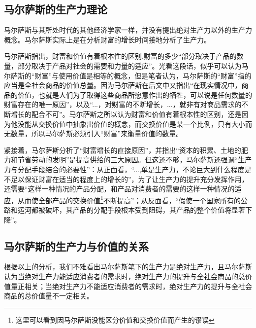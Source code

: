 \subsection{马尔萨斯的生产力理论}

马尔萨斯与其所处时代的其他经济学家一样，并没有提出绝对生产力以外的生产力概念。马尔萨斯实际上是在分析财富的增长时间接地分析了生产力。

马尔萨斯指出，财富和价值有着根本性的区别,财富的多少“部分取决于产品的数量，部分取决于产品对社会的需要和力量的适应”\cite[292]{BiLuo*SiLaFaDaWeiLiJiaTuQuanJiDi2JuanMaErSaSiZhengZhiJingJiXueYuanLiPingZhu2013}。光看这段话，似乎可以认为马尔萨斯的“财富”与使用价值是相等的概念，但是笔者认为，马尔萨斯的“财富”指的应当是全社会商品的价值总量。因为马尔萨斯在后文中又指出“在现实情况中，商品的价值，也就是人们为了取得这些商品所愿意作出的牺牲，可以说是任何数量的财富存在的唯一原因”\cite[292]{BiLuo*SiLaFaDaWeiLiJiaTuQuanJiDi2JuanMaErSaSiZhengZhiJingJiXueYuanLiPingZhu2013}，以及“...，对财富的不断增长，...，就非有对商品需求的不断增长的配合不可”\cite[355]{BiLuo*SiLaFaDaWeiLiJiaTuQuanJiDi2JuanMaErSaSiZhengZhiJingJiXueYuanLiPingZhu2013}。马尔萨斯之所以认为财富和价值有着根本性的区别，还是因为他没能从交换价值中抽象出价值的概念，而交换价值是某一个比例，只有大小而无数量，所以马尔萨斯必须引入“财富”来衡量价值的数量。

紧接着，马尔萨斯分析了“财富增长的直接原因”，并指出“资本的积累、土地的肥力和节省劳动的发明”是提高供给的三大原因\cite[355]{BiLuo*SiLaFaDaWeiLiJiaTuQuanJiDi2JuanMaErSaSiZhengZhiJingJiXueYuanLiPingZhu2013}。但这还不够，马尔萨斯还强调“生产力与分配手段结合的必要性”\cite[356]{BiLuo*SiLaFaDaWeiLiJiaTuQuanJiDi2JuanMaErSaSiZhengZhiJingJiXueYuanLiPingZhu2013}：从正面看，“...,单是生产力，不论巨大到什么程度是不足以保证财富在适当的程度上的增长的”，为了让生产力的提升充分发挥作用，还需要“这样一种情况的产品分配，和产品对消费者的需要的这样一种情况的适应，从而使全部产品的交换价值\footnote{这里可以看到因马尔萨斯没能区分价值和交换价值而产生的谬误}不断提高”\cite[356]{BiLuo*SiLaFaDaWeiLiJiaTuQuanJiDi2JuanMaErSaSiZhengZhiJingJiXueYuanLiPingZhu2013}；从反面看，“假使一个国家所有的公路和运河都被破坏，其产品的分配手段根本受到阻碍，其产品的整个价值将显著下降”\cite[357]{BiLuo*SiLaFaDaWeiLiJiaTuQuanJiDi2JuanMaErSaSiZhengZhiJingJiXueYuanLiPingZhu2013}。

\subsection{马尔萨斯的生产力与价值的关系}

根据以上的分析，我们不难看出马尔萨斯笔下的生产力是绝对生产力，且马尔萨斯认为当绝对生产力能适应消费者的需求时，绝对生产力的提升与全社会商品的总价值量正相关；当绝对生产力不能适应消费者的需求时，绝对生产力的提升与全社会商品的总价值量不一定相关。

